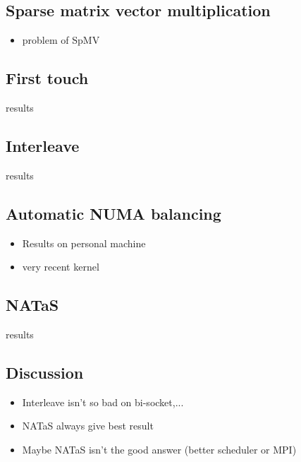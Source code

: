 \documentclass[oneside,12t]{classes/Thesis}
\begin{document}
\subsection{Sparse matrix vector multiplication}
  \begin{itemize}
    \item problem of SpMV
  \end{itemize}
\subsection{First touch}
results
\subsection{Interleave}
results
\subsection{Automatic NUMA balancing}
  \begin{itemize}
    \item Results on personal machine
    \item very recent kernel
  \end{itemize}
\subsection{NATaS}
results
\subsection{Discussion}
  \begin{itemize}
    \item Interleave isn't so bad on bi-socket,...
    \item NATaS always give best result
    \item Maybe NATaS isn't the good answer (better scheduler or MPI)
  \end{itemize}
\end{document}
